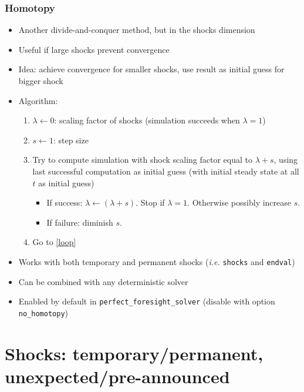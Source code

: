 \documentclass[handout,usepdftitle=false,xcolor=dvipsnames,aspectratio=169]{beamer}
\begin{document}
\begin{frame}
  \frametitle{Homotopy}
  \begin{itemize}
    \item Another divide-and-conquer method, but in the shocks dimension
    \item Useful if large shocks prevent convergence
    \item Idea: achieve convergence for smaller shocks, use result as
          initial guess for bigger shock
    \item Algorithm:
          \begin{enumerate}
            \item $\lambda\leftarrow 0$: scaling factor of shocks (simulation succeeds when
                  $\lambda=1$)

            \item $s \leftarrow 1$: step size
            \item \label{loop} Try to compute simulation with shock scaling factor equal to
                  $\lambda + s$, using last successful computation as initial guess (with initial steady state at all $t$ as initial guess)
                  \begin{itemize}
                    \item If success: $\lambda \leftarrow (\lambda+s)$. Stop if $\lambda=1$.
                          Otherwise possibly increase $s$.
                    \item If failure: diminish $s$.
                  \end{itemize}
            \item Go to \ref{loop}
          \end{enumerate}
    \item Works with both temporary and permanent shocks (\textit{i.e.}
          \texttt{shocks} and \texttt{endval})
    \item Can be combined with any deterministic solver
    \item Enabled by default in \texttt{perfect\_foresight\_solver} (disable with
          option \texttt{no\_homotopy})
  \end{itemize}
\end{frame}

\section[Shock types]{Shocks: temporary/permanent, unexpected/pre-announced}
\end{document}
